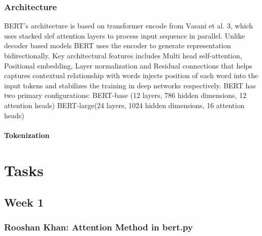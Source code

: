 \documentclass{article}
\begin{document}
\subsubsection{Architecture}
BERT's architecture is based on transformer encode from Vasani et al. 3, which uses stacked slef
attention layers to process input sequence in parallel. Unlike decoder based models BERT uses the 
encoder to generate representation bidirectionally. Key architectural features includes Multi head 
self-attention, Positional embedding, Layer normalization and Residual connections that helps 
captures contextual relationship with words injects position of each word into the input tokens and 
stabilizes the training in deep networks respectively. BERT has two primary configurations:
 BERT-base (12 layers, 786 hidden dimensions, 12 attention heads)
 BERT-large(24 layers, 1024 hidden dimensions, 16 attention heads)
\paragraph{Tokenization}
\section{Tasks}
\subsection{Week 1}
\subsubsection{Rooshan Khan: Attention Method in bert.py}
\end{document}
